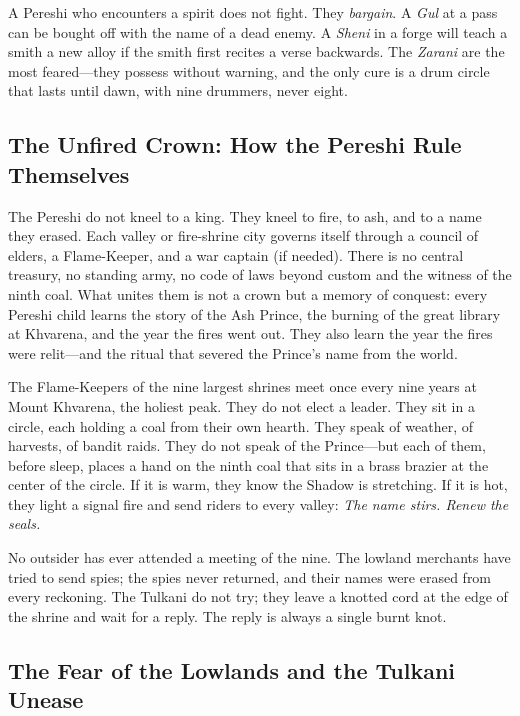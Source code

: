 A Pereshi who encounters a spirit does not fight. They \textit{bargain}. A \textit{Gul} at a pass can be bought off with the name of a dead enemy. A \textit{Sheni} in a forge will teach a smith a new alloy if the smith first recites a verse backwards. The \textit{Zarani} are the most feared---they possess without warning, and the only cure is a drum circle that lasts until dawn, with nine drummers, never eight.

\subsection*{The Unfired Crown: How the Pereshi Rule Themselves}
\label{subsec:pereshi-unfired-crown}

The Pereshi do not kneel to a king. They kneel to fire, to ash, and to a name they erased. Each valley or fire-shrine city governs itself through a council of elders, a Flame-Keeper, and a war captain (if needed). There is no central treasury, no standing army, no code of laws beyond custom and the witness of the ninth coal. What unites them is not a crown but a memory of conquest: every Pereshi child learns the story of the Ash Prince, the burning of the great library at Khvarena, and the year the fires went out. They also learn the year the fires were relit---and the ritual that severed the Prince's name from the world.

The Flame-Keepers of the nine largest shrines meet once every nine years at Mount Khvarena, the holiest peak. They do not elect a leader. They sit in a circle, each holding a coal from their own hearth. They speak of weather, of harvests, of bandit raids. They do not speak of the Prince---but each of them, before sleep, places a hand on the ninth coal that sits in a brass brazier at the center of the circle. If it is warm, they know the Shadow is stretching. If it is hot, they light a signal fire and send riders to every valley: \textit{The name stirs. Renew the seals.}

No outsider has ever attended a meeting of the nine. The lowland merchants have tried to send spies; the spies never returned, and their names were erased from every reckoning. The Tulkani do not try; they leave a knotted cord at the edge of the shrine and wait for a reply. The reply is always a single burnt knot.

\subsection*{The Fear of the Lowlands and the Tulkani Unease}
\label{subsec:pereshi-fear-and-unease}

